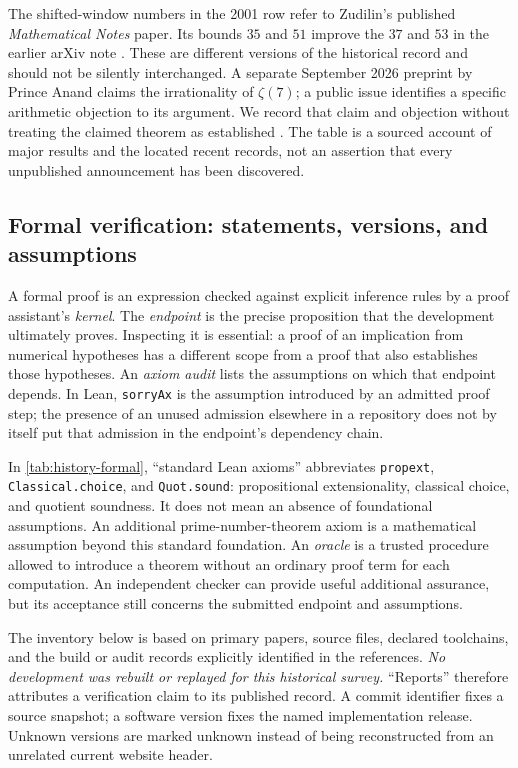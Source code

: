 \documentclass[11pt,letterpaper]{article}
\theoremstyle{definition}
\begin{document}
The shifted-window numbers in the 2001 row refer to Zudilin's published
\emph{Mathematical Notes} paper.  Its bounds $35$ and $51$ improve the
$37$ and $53$ in the earlier arXiv note \cite{zudilin2001note}.
These are different versions of the historical record and should not be
silently interchanged.  A separate September 2026 preprint by Prince
Anand claims the irrationality of $\zeta(7)$; a public issue identifies a
specific arithmetic objection to its argument.  We record that claim
and objection without treating the claimed theorem as established
\cite{anand2026,anandobjection}.  The table is a sourced account of major
results and the located recent records, not an assertion that every
unpublished announcement has been discovered.

\subsection{Formal verification: statements, versions, and assumptions}

A formal proof is an expression checked against explicit inference rules
by a proof assistant's \emph{kernel}.  The \emph{endpoint} is the precise
proposition that the development ultimately proves.  Inspecting it is
essential: a proof of an implication from numerical hypotheses has a
different scope from a proof that also establishes those hypotheses.
An \emph{axiom audit} lists the assumptions on which that endpoint depends.
In Lean, \texttt{sorryAx} is the assumption introduced by an admitted proof
step; the presence of an unused admission elsewhere in a repository does
not by itself put that admission in the endpoint's dependency chain.

In \cref{tab:history-formal}, ``standard Lean axioms'' abbreviates
\texttt{propext}, \texttt{Classical.choice}, and \texttt{Quot.sound}:
propositional extensionality, classical choice, and quotient soundness.
It does not mean an absence of foundational assumptions.  An additional
prime-number-theorem axiom is a mathematical assumption beyond this
standard foundation.  An \emph{oracle} is a trusted procedure allowed to
introduce a theorem without an ordinary proof term for each computation.
An independent checker can provide useful additional assurance, but its
acceptance still concerns the submitted endpoint and assumptions.

The inventory below is based on primary papers, source files, declared
toolchains, and the build or audit records explicitly identified in the
references.  \emph{No development was rebuilt or replayed for this
historical survey.}  ``Reports'' therefore attributes a verification
claim to its published record.  A commit identifier fixes a source
snapshot; a software version fixes the named implementation release.
Unknown versions are marked unknown instead of being reconstructed from
an unrelated current website header.
\end{document}
